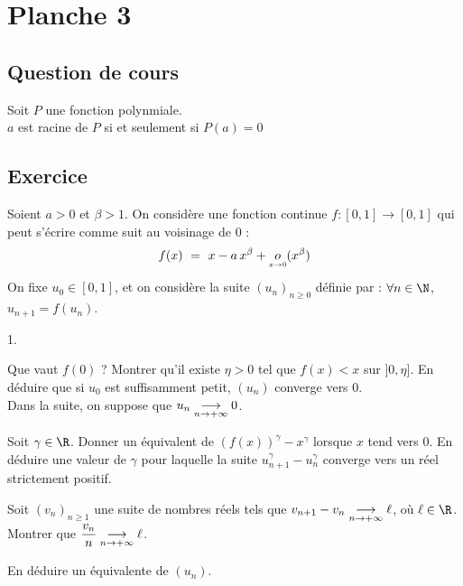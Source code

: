 \documentclass[11pt]{article}%
\begin{document}
\newpage




\section*{Planche 3}

\subsection*{Question de cours}

\noindent
Soit $P$ une fonction polynmiale.\\
$a$ est racine de $P$ si et seulement si $P(a)=0$



\subsection*{Exercice} %

\noindent
Soient $a>0$ et $\beta>1$. On considère une fonction continue $f : 
[0,1] \to [0,1]$ qui peut s'écrire comme suit au voisinage de $0$ :
\[
 f(x) \ = \ x - a \, x^\beta + {\underset {{\overset {x\rightarrow 0}{}}}{o}}(x^\beta)
\]
On fixe $u_0 \in [0,1]$, et on considère la suite $(u_n)_{n\geq 0}$ 
définie par : $\forall n \in \N$, $u_{n+1} = f(u_n)$.
\begin{noliste}{1.}
 \item Que vaut $f(0)$ ? Montrer qu'il existe $\eta >0$ tel que $f(x) 
 <x$ sur $]0,\eta]$. En déduire que si $u_0$ est suffisamment petit, 
 $(u_n)$ converge vers $0$.\\
 Dans la suite, on suppose que $u_n \underset{n\to +\infty}{\longrightarrow} 0$.
 
 \item Soit $\gamma \in \R$. Donner un équivalent de $(f(x))^\gamma - 
 x^\gamma$ lorsque $x$ tend vers $0$. En déduire une valeur de $
 \gamma$ pour laquelle la suite $u_{n+1}^\gamma - u_n^\gamma$ 
 converge vers un réel strictement positif.
 
 \item Soit $(v_n)_{n\geq 1}$ une suite de nombres réels tels que 
 $v_{n+1}-v_n \underset{n\to +\infty}{\longrightarrow} \ell$, où $\ell \in \R$. Montrer que $
 \dfrac{v_n}{n} \underset{n\to +\infty}{\longrightarrow} \ell$.
 
 \item En déduire un équivalente de $(u_n)$.
\end{noliste}
\end{document}
